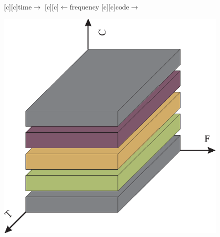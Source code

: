 \documentclass{article}
\begin{document}
\begin{figure}[htb]
  \begin{center}
    	
        [c][c]{$\mathrm{time}\rightarrow$}
        [c][c]{$\leftarrow \mathrm{frequency}$}
	[c]{\hspace{7mm}$\mathrm{code}\rightarrow$}

    \includegraphics{cdma_psfrag.eps}
    \end{center}
\end{figure}
\end{document}
